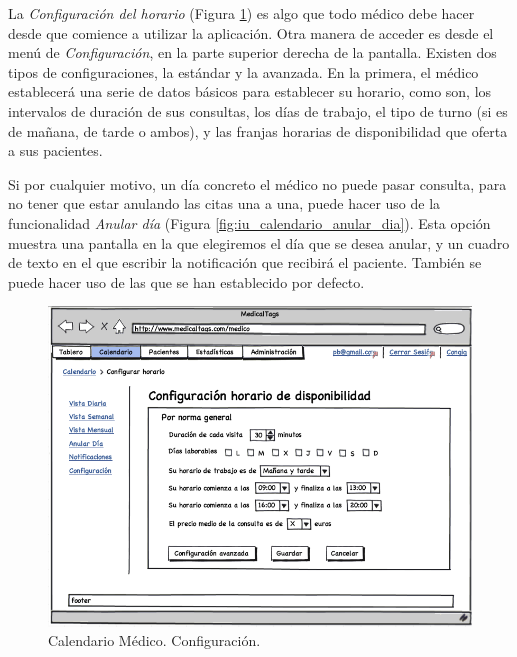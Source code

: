 			La \textit{Configuración del horario} (Figura \ref{fig:iu_calendario_configuracion}) es algo que todo médico debe hacer desde que comience a utilizar la aplicación. Otra manera de acceder es desde el menú de \textit{Configuración}, en la parte superior derecha de la pantalla. 
			Existen dos tipos de configuraciones, la estándar y la avanzada. En la primera, el médico establecerá una serie de datos básicos para establecer su horario, como son, los intervalos de duración de sus consultas, los días de trabajo, el tipo de turno (si es de mañana, de tarde o ambos), y las franjas horarias de disponibilidad que oferta a sus pacientes.
			
				
				Si por cualquier motivo, un día concreto el médico no puede pasar consulta, para no tener que estar anulando las citas una a una, puede hacer uso de la funcionalidad \textit{Anular día} (Figura \ref{fig:iu_calendario_anular_dia}). Esta opción muestra una pantalla en la que elegiremos el día que se desea anular, y un cuadro de texto en el que escribir la notificación que recibirá el paciente. También se puede hacer uso de las que se han establecido por defecto.
				
			
			\begin{figure}[H]
			  \centering
			    \includegraphics[width=12cm]{img/png/interfaz/15_Calendario_Medico_Configuracion.png}
			  \caption{Calendario Médico. Configuración.}
			  \label{fig:iu_calendario_configuracion}
			\end{figure}
			
